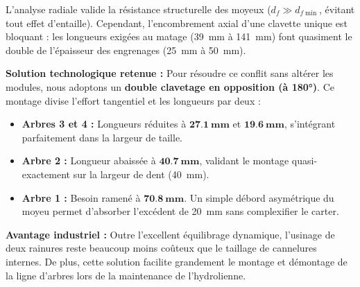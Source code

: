 \documentclass[11pt,a4paper]{article}
\begin{document}
\begin{tcolorbox}[colback=BoxBg, colframe=TealAccent, arc=4pt, boxrule=1pt, title=\textbf{Analyse du conflit et optimisation de la conception}]
L'analyse radiale valide la résistance structurelle des moyeux ($d_f \gg d_{f\min}$, évitant tout effet d'entaille). Cependant, l'encombrement axial d'une clavette unique est bloquant : les longueurs exigées au matage (\qty{39}{\milli\meter} à \qty{141}{\milli\meter}) font quasiment le double de l'épaisseur des engrenages (\qty{25}{\milli\meter} à \qty{50}{\milli\meter}).

\medskip
\textbf{Solution technologique retenue :} Pour résoudre ce conflit sans altérer les modules, nous adoptons un \textbf{double clavetage en opposition (à 180°)}. Ce montage divise l'effort tangentiel et les longueurs par deux :
\begin{itemize}
    \item \textbf{Arbres 3 et 4 :} Longueurs réduites à $\mathbf{\qty{27,1}{\milli\meter}}$ et $\mathbf{\qty{19,6}{\milli\meter}}$, s'intégrant parfaitement dans la largeur de taille.
    \item \textbf{Arbre 2 :} Longueur abaissée à $\mathbf{\qty{40,7}{\milli\meter}}$, validant le montage quasi-exactement sur la largeur de dent (\qty{40}{\milli\meter}).
    \item \textbf{Arbre 1 :} Besoin ramené à $\mathbf{\qty{70,8}{\milli\meter}}$. Un simple débord asymétrique du moyeu permet d'absorber l'excédent de \qty{20}{\milli\meter} sans complexifier le carter.
\end{itemize}

\medskip
\textbf{Avantage industriel :} Outre l'excellent équilibrage dynamique, l'usinage de deux rainures reste beaucoup moins coûteux que le taillage de cannelures internes. De plus, cette solution facilite grandement le montage et démontage de la ligne d'arbres lors de la maintenance de l'hydrolienne.
\end{tcolorbox}
\end{document}
